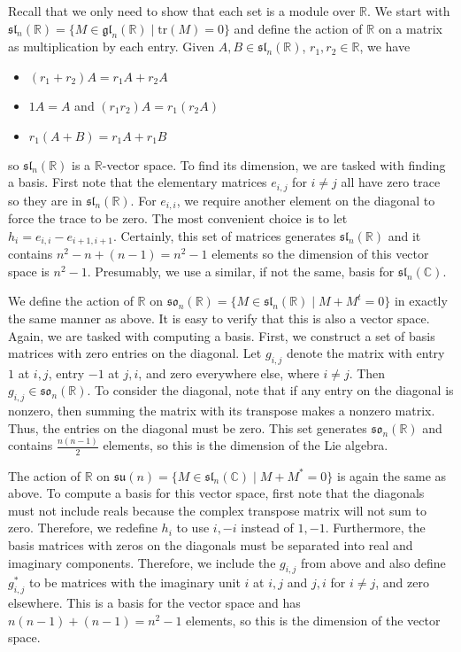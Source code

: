 \documentclass[../../master.tex]{subfiles}
\begin{document}
\begin{solution}
    Recall that we only need to show that each set is a module over $\mathbb{R}$.
    We start with $\mathfrak{sl}_n(\mathbb{R}) = \{M \in \mathfrak{gl}_n(\mathbb{R}) \mid \text{tr}(M) = 0\}$ and define the action of $\mathbb{R}$ on a matrix as multiplication by each entry.
    Given $A, B \in \mathfrak{sl}_n(\mathbb{R})$, $r_1, r_2 \in \mathbb{R}$, we have
    \begin{itemize}
        \item $(r_1 + r_2) A = r_1 A + r_2 A$
        \item $1 A = A$ and $(r_1 r_2) A = r_1 (r_2 A)$
        \item $r_1 (A + B) = r_1 A + r_1 B$
    \end{itemize}
    so $\mathfrak{sl}_n (\mathbb{R})$ is a $\mathbb{R}$-vector space.
    To find its dimension, we are tasked with finding a basis.
    First note that the elementary matrices $e_{i, j}$ for $i \neq j$ all have zero trace so they are in $\mathfrak{sl}_n (\mathbb{R})$.
    For $e_{i, i}$, we require another element on the diagonal to force the trace to be zero.
    The most convenient choice is to let $h_i = e_{i, i} - e_{i+1, i+1}$.
    Certainly, this set of matrices generates $\mathfrak{sl}_n (\mathbb{R})$ and it contains $n^2 - n + (n - 1) = n^2 - 1$ elements so the dimension of this vector space is $n^2 - 1$.
    Presumably, we use a similar, if not the same, basis for $\mathfrak{sl}_n(\mathbb{C})$.

    We define the action of $\mathbb{R}$ on $\mathfrak{so}_n(\mathbb{R}) = \{M \in \mathfrak{sl}_n (\mathbb{R}) \mid M + M^{t} = 0\}$ in exactly the same manner as above.
    It is easy to verify that this is also a vector space.
    Again, we are tasked with computing a basis.
    First, we construct a set of basis matrices with zero entries on the diagonal.
    Let $g_{i, j}$ denote the matrix with entry $1$ at $i, j$, entry $-1$ at $j, i$, and zero everywhere else, where $i \neq j$.
    Then $g_{i, j} \in \mathfrak{so}_n(\mathbb{R})$.
    To consider the diagonal, note that if any entry on the diagonal is nonzero, then summing the matrix with its transpose makes a nonzero matrix. 
    Thus, the entries on the diagonal must be zero.
    This set generates $\mathfrak{so}_n(\mathbb{R})$ and contains $\frac{n(n-1)}{2}$ elements, so this is the dimension of the Lie algebra. 

    The action of $\mathbb{R}$ on $\mathfrak{su}(n) = \{M \in \mathfrak{sl}_n(\mathbb{C}) \mid M + M^{*} = 0\}$ is again the same as above.
    To compute a basis for this vector space, first note that the diagonals must not include reals because the complex transpose matrix will not sum to zero.
    Therefore, we redefine $h_i$ to use $i, -i$ instead of $1, -1$.
    Furthermore, the basis matrices with zeros on the diagonals must be separated into real and imaginary components.
    Therefore, we include the $g_{i, j}$ from above and also define $g^{*}_{i, j}$ to be matrices with the imaginary unit $i$ at $i, j$ and $j, i$ for $i \neq j$, and zero elsewhere.
    This is a basis for the vector space and has $n (n-1) + (n-1) = n^2 - 1$ elements, so this is the dimension of the vector space.
\end{solution}
\end{document}
